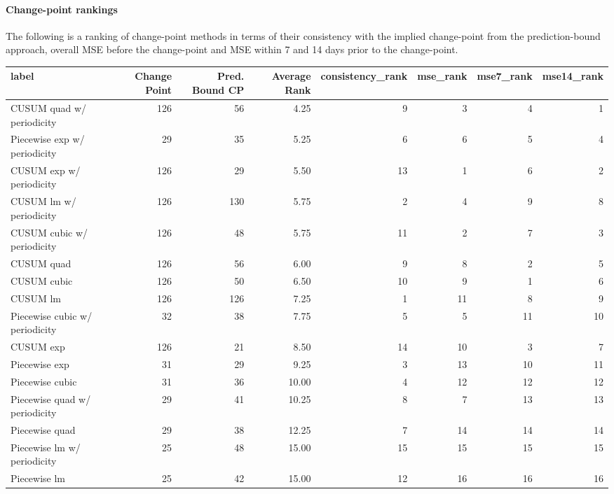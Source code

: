 \documentclass[
]{article}
\begin{document}
\hypertarget{change-point-rankings}{%
\paragraph{Change-point rankings}\label{change-point-rankings}}

The following is a ranking of change-point methods in terms of their
consistency with the implied change-point from the prediction-bound
approach, overall MSE before the change-point and MSE within 7 and 14
days prior to the change-point.

\begin{table}
\centering
\begin{tabular}{l|r|r|r|r|r|r|r}
\hline
label & Change Point & Pred. Bound CP & Average Rank & consistency\_rank & mse\_rank & mse7\_rank & mse14\_rank\\
\hline
CUSUM quad w/ periodicity & 126 & 56 & 4.25 & 9 & 3 & 4 & 1\\
\hline
Piecewise exp w/ periodicity & 29 & 35 & 5.25 & 6 & 6 & 5 & 4\\
\hline
CUSUM exp w/ periodicity & 126 & 29 & 5.50 & 13 & 1 & 6 & 2\\
\hline
CUSUM lm w/ periodicity & 126 & 130 & 5.75 & 2 & 4 & 9 & 8\\
\hline
CUSUM cubic w/ periodicity & 126 & 48 & 5.75 & 11 & 2 & 7 & 3\\
\hline
CUSUM quad & 126 & 56 & 6.00 & 9 & 8 & 2 & 5\\
\hline
CUSUM cubic & 126 & 50 & 6.50 & 10 & 9 & 1 & 6\\
\hline
CUSUM lm & 126 & 126 & 7.25 & 1 & 11 & 8 & 9\\
\hline
Piecewise cubic w/ periodicity & 32 & 38 & 7.75 & 5 & 5 & 11 & 10\\
\hline
CUSUM exp & 126 & 21 & 8.50 & 14 & 10 & 3 & 7\\
\hline
Piecewise exp & 31 & 29 & 9.25 & 3 & 13 & 10 & 11\\
\hline
Piecewise cubic & 31 & 36 & 10.00 & 4 & 12 & 12 & 12\\
\hline
Piecewise quad w/ periodicity & 29 & 41 & 10.25 & 8 & 7 & 13 & 13\\
\hline
Piecewise quad & 29 & 38 & 12.25 & 7 & 14 & 14 & 14\\
\hline
Piecewise lm w/ periodicity & 25 & 48 & 15.00 & 15 & 15 & 15 & 15\\
\hline
Piecewise lm & 25 & 42 & 15.00 & 12 & 16 & 16 & 16\\
\hline
\end{tabular}
\end{table}
\end{document}
